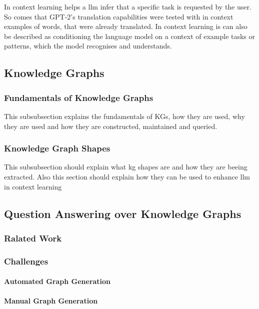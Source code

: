 In context learning helps a \gls{llm} infer that a specific task is requested by the user. So comes that GPT-2's translation capabilities were tested with in context examples of words, that were already translated. In context learning is can also be described as conditioning the language model on a context of example tasks or patterns, which the model recognises and understands.\cite{radfordLanguageModelsAre}

\subsection{Knowledge Graphs}
\subsubsection{Fundamentals of Knowledge Graphs}
This subsubsection explains the fundamentals of KGs, how they are used, why they are used and how they are constructed, maintained and queried.

\subsubsection{Knowledge Graph Shapes}
This subsubsection should explain what \gls{kg} shapes are and how they are beeing extracted. Also this section should explain how they can be used to enhance \gls{llm} in context learning

\subsection{Question Answering over Knowledge Graphs}
\subsubsection{Ralated Work}
\subsubsection{Challenges}
\paragraph{Automated Graph Generation}
\paragraph{Manual Graph Generation}
